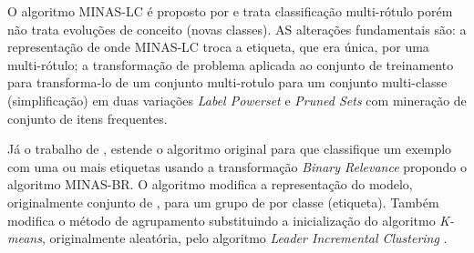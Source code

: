 O algoritmo MINAS-LC é proposto por  e trata classificação
multi-rótulo porém não trata evoluções de conceito (novas classes).
AS alterações fundamentais são:
a representação de \cluster onde MINAS-LC troca a etiqueta, que era única, por uma multi-rótulo;
a transformação de problema aplicada ao conjunto de treinamento para transforma-lo de um
conjunto multi-rotulo para um conjunto multi-classe (simplificação)
em duas variações \emph{Label Powerset} e \emph{Pruned Sets} com
mineração de conjunto de itens frequentes.


Já o trabalho de , estende o algoritmo original para que
classifique um exemplo com uma ou mais etiquetas usando a transformação
\emph{Binary Relevance} propondo o algoritmo MINAS-BR.
O algoritmo modifica a representação do modelo, originalmente conjunto de \clusters, para
um grupo de \clusters por classe (etiqueta).
Também modifica o método de agrupamento substituindo a inicialização do 
algoritmo \emph{K-means}, originalmente aleatória, pelo algoritmo 
\emph{Leader Incremental Clustering} \cite{Vijaya2004505}.


